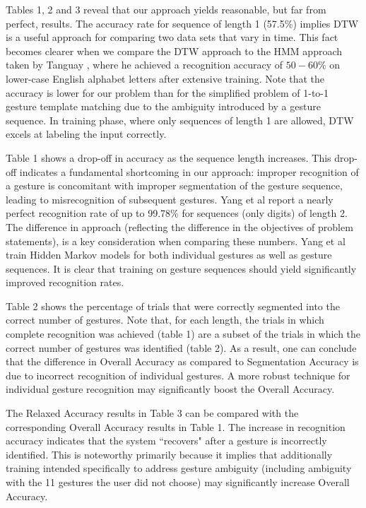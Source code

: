 \documentclass[twoside]{article}
\begin{document}
\begin{multicols}{2}
Tables 1, 2 and 3 reveal that our approach yields reasonable, but far from
perfect, results. The accuracy rate for sequence of length 1 (57.5\%) implies
DTW is a useful approach for comparing two data sets that vary in time.
This fact becomes clearer when we compare the DTW approach to the HMM approach
taken by Tanguay \cite{tanguay_jr_hidden_1995}, where he achieved a recognition
accuracy of $50-60\%$ on lower-case English alphabet letters after extensive
training. Note that the accuracy is lower for our problem than for the
simplified problem of 1-to-1 gesture template matching due to the ambiguity
introduced by a gesture sequence. In training phase, where only sequences of
length 1 are allowed, DTW excels at labeling the input correctly.

Table 1 shows a drop-off in accuracy as the sequence length increases. This
drop-off indicates a fundamental shortcoming in our approach: improper
recognition of a gesture is concomitant with improper segmentation of the
gesture sequence, leading to misrecognition of subsequent gestures. Yang et al
\cite{yang_gesture_1994} report a nearly perfect recognition rate of up to
99.78\% for sequences (only digits) of length 2. The difference in approach (reflecting
the difference in the objectives of problem statements), is a key consideration when comparing these
numbers. Yang et al train Hidden Markov models for both individual gestures as
well as gesture sequences. It is clear that training on gesture sequences
should yield significantly improved recognition rates.

Table 2 shows the percentage of trials that were correctly segmented into the
correct number of gestures. Note that, for each length, the trials in which
complete recognition was achieved (table 1) are a subset of the trials in which
the correct number of gestures was identified (table 2). As a result, one can
conclude that the difference in Overall Accuracy as compared to Segmentation
Accuracy is due to incorrect recognition of individual gestures. A more robust
technique for individual gesture recognition may significantly boost the
Overall Accuracy.

The Relaxed Accuracy results in Table 3 can be compared with the corresponding
Overall Accuracy results in Table 1. The increase in recognition accuracy
indicates that the system ``recovers" after a gesture is incorrectly identified.
This is noteworthy primarily because it implies that additionally training
intended specifically to address gesture ambiguity (including ambiguity with the
11 gestures the user did not choose) may significantly increase Overall
Accuracy.


\end{multicols}
\end{document}
